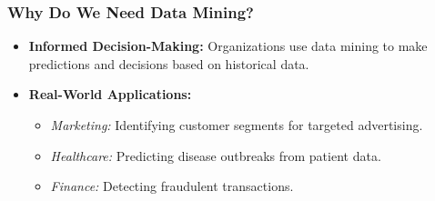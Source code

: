 \documentclass[aspectratio=169]{beamer}
\begin{document}
\begin{frame}[fragile]
    \frametitle{Why Do We Need Data Mining?}
    \begin{itemize}
        \item \textbf{Informed Decision-Making:} Organizations use data mining to make predictions and decisions based on historical data.
        \item \textbf{Real-World Applications:}
            \begin{itemize}
                \item \textit{Marketing:} Identifying customer segments for targeted advertising.
                \item \textit{Healthcare:} Predicting disease outbreaks from patient data.
                \item \textit{Finance:} Detecting fraudulent transactions.
            \end{itemize}
    \end{itemize}
\end{frame}
\end{document}
